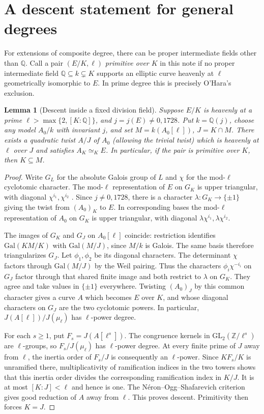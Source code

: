 \documentclass[11pt]{article}
\newtheorem{lemma}[theorem]{Lemma}
\begin{document}
\section*{A descent statement for general degrees}
For extensions of composite degree, there can be proper intermediate fields
other than $\mathbb Q$. Call a pair $(E/K,\ell)$ \emph{primitive over $K$}
in this note if no proper intermediate field $\mathbb Q\subseteq k\subsetneq K$
supports an elliptic curve heavenly at $\ell$ geometrically isomorphic to $E$.
In prime degree this is precisely O'Hara's exclusion.

\begin{lemma}[Descent inside a fixed division field]
Suppose $E/K$ is heavenly at a prime $\ell>\max\{2,[K:\mathbb Q]\}$, and
$j=j(E)\ne0,1728$. Put $k=\mathbb Q(j)$, choose any model $A_0/k$ with
invariant $j$, and set $M=k(A_0[\ell])$, $J=K\cap M$. There exists a
quadratic twist $A/J$ of $A_0$ (allowing the trivial twist) which is heavenly
at $\ell$ over $J$ and satisfies $A_K\simeq_K E$.
In particular, if the pair is primitive over $K$, then $K\subseteq M$.
\end{lemma}
\begin{proof}
Write $G_L$ for the absolute Galois group of $L$ and $\chi$ for the
mod-$\ell$ cyclotomic character. The mod-$\ell$ representation of $E$ on $G_K$
is upper triangular, with diagonal $\chi^{i_1},\chi^{i_2}$
\cite[Proposition 2.4]{ohara}. Since $j\ne0,1728$, there is a character
$\lambda:G_K\to\{\pm1\}$ giving the twist from $(A_0)_K$ to $E$.
In corresponding bases the mod-$\ell$ representation of $A_0$ on $G_K$ is
upper triangular, with diagonal $\lambda\chi^{i_1},\lambda\chi^{i_2}$.

The images of $G_K$ and $G_J$ on $A_0[\ell]$ coincide: restriction identifies
$\mathrm{Gal}(KM/K)$ with $\mathrm{Gal}(M/J)$, since $M/k$ is Galois.
The same basis therefore triangularizes $G_J$. Let $\phi_1,\phi_2$ be
its diagonal characters. The determinant $\chi$ factors through
$\mathrm{Gal}(M/J)$ by the Weil pairing. Thus the characters
$\phi_i\chi^{-i_i}$ on $G_J$ factor through that shared finite image and
both restrict to $\lambda$ on $G_K$. They agree and take values in
$\{\pm1\}$ everywhere. Twisting $(A_0)_J$ by this common character gives a
curve $A$ which becomes $E$ over $K$, and whose diagonal characters on
$G_J$ are the two cyclotomic powers. In particular,
$J(A[\ell])/J(\mu_\ell)$ has $\ell$-power degree.

For each $s\ge1$, put $F_s=J(A[\ell^s])$. The congruence kernels in
$\mathrm{GL}_2(\mathbb Z/\ell^s)$ are $\ell$-groups, so
$F_s/J(\mu_\ell)$ has $\ell$-power degree. At every finite prime of $J$
away from $\ell$, the inertia order of $F_s/J$ is consequently an
$\ell$-power. Since $KF_s/K$ is unramified there, multiplicativity of
ramification indices in the two towers shows that this inertia order
divides the corresponding ramification index in $K/J$. It is at most
$[K:J]<\ell$ and hence is one. The N\'eron--Ogg--Shafarevich criterion
gives good reduction of $A$ away from $\ell$. This proves descent. Primitivity
then forces $K=J$.
\end{proof}
\end{document}
